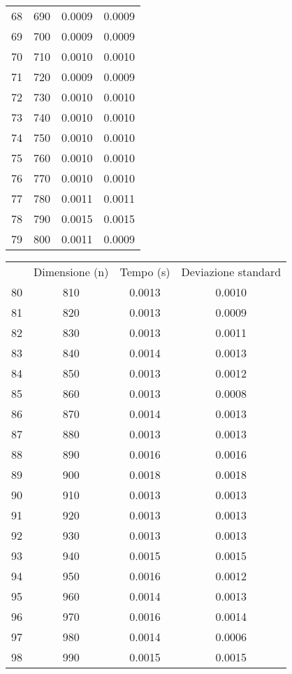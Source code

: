 \begin{table}
\begin{adjustbox}{width=1\textwidth/2}
\begin{tabular}{|c|c|c|c|}
68 & 690 & 0.0009 & 0.0009 \\
\cline{1-4}
69 & 700 & 0.0009 & 0.0009 \\
\cline{1-4}
70 & 710 & 0.0010 & 0.0010 \\
\cline{1-4}
71 & 720 & 0.0009 & 0.0009 \\
\cline{1-4}
72 & 730 & 0.0010 & 0.0010 \\
\cline{1-4}
73 & 740 & 0.0010 & 0.0010 \\
\cline{1-4}
74 & 750 & 0.0010 & 0.0010 \\
\cline{1-4}
75 & 760 & 0.0010 & 0.0010 \\
\cline{1-4}
76 & 770 & 0.0010 & 0.0010 \\
\cline{1-4}
77 & 780 & 0.0011 & 0.0011 \\
\cline{1-4}
78 & 790 & 0.0015 & 0.0015 \\
\cline{1-4}
79 & 800 & 0.0011 & 0.0009 \\
\cline{1-4}
\end{tabular}
\end{adjustbox}
\end{table}

\begin{table}
\centering
\begin{adjustbox}{width=1\textwidth/2}
\begin{tabular}{|c|c|c|c|}
\hline
 & Dimensione (n) & Tempo (s) & Deviazione standard \\
80 & 810 & 0.0013 & 0.0010 \\
\cline{1-4}
81 & 820 & 0.0013 & 0.0009 \\
\cline{1-4}
82 & 830 & 0.0013 & 0.0011 \\
\cline{1-4}
83 & 840 & 0.0014 & 0.0013 \\
\cline{1-4}
84 & 850 & 0.0013 & 0.0012 \\
\cline{1-4}
85 & 860 & 0.0013 & 0.0008 \\
\cline{1-4}
86 & 870 & 0.0014 & 0.0013 \\
\cline{1-4}
87 & 880 & 0.0013 & 0.0013 \\
\cline{1-4}
88 & 890 & 0.0016 & 0.0016 \\
\cline{1-4}
89 & 900 & 0.0018 & 0.0018 \\
\cline{1-4}
90 & 910 & 0.0013 & 0.0013 \\
\cline{1-4}
91 & 920 & 0.0013 & 0.0013 \\
\cline{1-4}
92 & 930 & 0.0013 & 0.0013 \\
\cline{1-4}
93 & 940 & 0.0015 & 0.0015 \\
\cline{1-4}
94 & 950 & 0.0016 & 0.0012 \\
\cline{1-4}
95 & 960 & 0.0014 & 0.0013 \\
\cline{1-4}
96 & 970 & 0.0016 & 0.0014 \\
\cline{1-4}
97 & 980 & 0.0014 & 0.0006 \\
\cline{1-4}
98 & 990 & 0.0015 & 0.0015 \\
\cline{1-4}
\end{tabular}
\end{adjustbox}
\end{table}

